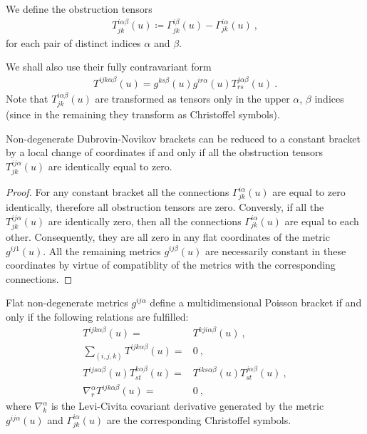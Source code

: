 \begin{definition}
    We define the obstruction tensors
    \begin{align}
        T^{i \alpha \beta}_{jk} (u) \coloneqq \Gamma^{i \beta}_{jk}(u) - \Gamma^{i \alpha}_{jk}(u) \:,
    \end{align}
    for each pair of distinct indices $\alpha$ and $\beta$.
\end{definition}
We shall also use their fully contravariant form
\begin{align}
    T^{ijk \alpha \beta}(u) = g^{ks \beta}(u) g^{i r \alpha}(u) T^{j \alpha \beta}_{rs} (u) \:.
\end{align}
Note that $T^{i \alpha \beta}_{jk} (u)$ are transformed as tensors only in the upper $\alpha$, $\beta$ indices (since in the remaining they transform as Christoffel symbols).

\begin{lemma} \label{lemma:T=0}
    Non-degenerate Dubrovin-Novikov brackets can be reduced to a constant bracket by a local change of coordinates if and only if all the obstruction tensors $T^{ij \alpha}_{jk}(u)$ are identically equal to zero.
\end{lemma}
\begin{proof}
    For any constant bracket all the connections $\Gamma^{i\alpha}_{jk}(u)$ are equal to zero identically, therefore all obstruction tensors are zero. Conversly, if all the $T^{ij \alpha}_{jk}(u)$ are identically zero, then all the connections $\Gamma^{i\alpha}_{jk}(u)$ are equal to each other. Consequently, they are all zero in any flat coordinates of the metric $g^{ij 1}(u)$. All the remaining metrics $g^{ij \beta}(u)$ are necessarily constant in these coordinates by virtue of compatiblity of the metrics with the corresponding connections.
\end{proof}


\begin{theorem}[Mokhov]
    Flat non-degenerate metrics $g^{ij \alpha}$ define a multidimensional Poisson bracket if and only if the following relations are fulfilled:
    \begin{align}
        T^{ijk \alpha \beta}(u) =& T^{kji \alpha \beta}(u) \:, \label{eq:Mochov-1}\\
        \sum_{(i,j,k)} T^{ijk \alpha \beta}(u) =& 0 \:, \label{eq:Mochov-2}\\
        T^{ij s \alpha \beta}(u) T^{k \alpha \beta}_{st}(u) =& T^{i k s \alpha \beta}(u) T^{j \alpha \beta}_{st} (u) \:, \label{eq:Mochov-3}\\
        \nabla^\alpha_r T^{ijk \alpha \beta}(u) =& 0 \:, \label{eq:Mochov-4}
    \end{align}
    where $\nabla^\alpha_k$ is the Levi-Civita covariant derivative generated by the metric $g^{ij \alpha}(u)$ and $\Gamma^{i \alpha}_{jk}(u)$ are the corresponding Christoffel symbols. 
\end{theorem}

